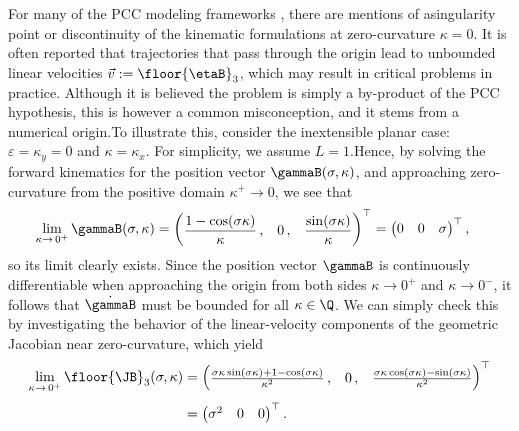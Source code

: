 \begin{rmk} For many of the PCC modeling frameworks \cite{Falkenhahn2015}, there are mentions of a\editl singularity point or discontinuity of the kinematic formulations at zero-curvature $\kappa = 0$. It is often reported that trajectories that pass through the origin lead to unbounded linear velocities $\vec{v} := \floor{\etaB}_3$, which may result in critical problems in practice. Although it is believed the problem is simply a by-product of the PCC hypothesis, this is however a common misconception, and it stems from a numerical origin.\editr To illustrate this, consider the inextensible planar case: $\varepsilon = \kappa_y = 0$ and $\kappa = \kappa_x$. \editl For simplicity, we assume $L = 1$.\editr Hence, by solving the forward kinematics for the position vector $\gammaB(\sigma,\kappa)$, and approaching zero-curvature from the positive domain $\kappa^{+} \to 0$, we see that
%
\begin{align}
\lim_{\kappa \to \,0^{+}}\gammaB(\sigma,\kappa) & = \begin{pmatrix} \dfrac{1-\cos(\sigma \kappa)}{\kappa}\,, & 0\,, & \dfrac{\sin(\sigma \kappa)}{\kappa} \end{pmatrix}^\top = \begin{pmatrix} 0 & 0 & \sigma \end{pmatrix}^\top,
\end{align}
%
so its limit clearly exists. Since the position vector $\gammaB$ is continuously differentiable when approaching the origin from both sides $\kappa \to 0^+$ and $\kappa \to 0^{-}$, it follows that $\dot{\gammaB}$ must be bounded for all $\kappa \in \Q$. We can simply check this by investigating the behavior of the linear-velocity components of the geometric Jacobian near zero-curvature, which yield
%
\begin{align}
\lim_{\kappa \to \,0^+} \floor{\JB}_3(\sigma,\kappa) & = \begin{pmatrix} \tfrac{\sigma \kappa \sin(\sigma \kappa) + 1 - \cos(\sigma \kappa)}{\kappa^2}\,, & 0\,, & \tfrac{\sigma \kappa \cos(\sigma \kappa) - \sin(\sigma \kappa) }{\kappa^2} \end{pmatrix}^\top \notag \\[0.35em] & = \begin{pmatrix} \sigma^2 & 0 & 0 \end{pmatrix}^\top.
\end{align}
%

\end{rmk}
